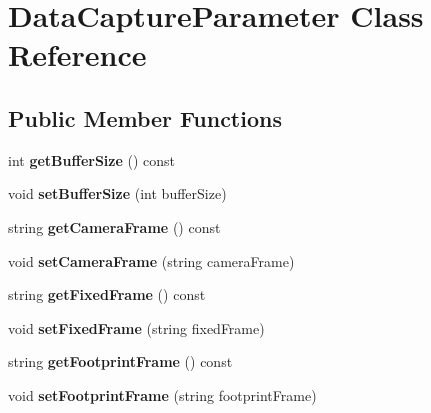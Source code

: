 \hypertarget{classDataCaptureParameter}{\section{\-Data\-Capture\-Parameter \-Class \-Reference}
\label{classDataCaptureParameter}
}
\subsection*{\-Public \-Member \-Functions}
\begin{DoxyCompactItemize}
\item 
\hypertarget{classDataCaptureParameter_a4093e9c66b27849b450bf1bcab7ac35c}{int {\bfseries get\-Buffer\-Size} () const }\label{classDataCaptureParameter_a4093e9c66b27849b450bf1bcab7ac35c}

\item 
\hypertarget{classDataCaptureParameter_aacc7e04c950a9faeec620666eeab7ada}{void {\bfseries set\-Buffer\-Size} (int buffer\-Size)}\label{classDataCaptureParameter_aacc7e04c950a9faeec620666eeab7ada}

\item 
\hypertarget{classDataCaptureParameter_ae1a89313d8378d198adef62ea7b64ab9}{string {\bfseries get\-Camera\-Frame} () const }\label{classDataCaptureParameter_ae1a89313d8378d198adef62ea7b64ab9}

\item 
\hypertarget{classDataCaptureParameter_a7c99eb34bd0ee36ab27591ca465e9981}{void {\bfseries set\-Camera\-Frame} (string camera\-Frame)}\label{classDataCaptureParameter_a7c99eb34bd0ee36ab27591ca465e9981}

\item 
\hypertarget{classDataCaptureParameter_ab68428f31daf6f9e4a537cc3144cdc61}{string {\bfseries get\-Fixed\-Frame} () const }\label{classDataCaptureParameter_ab68428f31daf6f9e4a537cc3144cdc61}

\item 
\hypertarget{classDataCaptureParameter_a7132c6affa2fe957772d9723080e8349}{void {\bfseries set\-Fixed\-Frame} (string fixed\-Frame)}\label{classDataCaptureParameter_a7132c6affa2fe957772d9723080e8349}

\item 
\hypertarget{classDataCaptureParameter_a9ea7189cf620f5ce6ce986151ae59678}{string {\bfseries get\-Footprint\-Frame} () const }\label{classDataCaptureParameter_a9ea7189cf620f5ce6ce986151ae59678}

\item 
\hypertarget{classDataCaptureParameter_a4435144260e57fdba3bc43ff34d5fd4e}{void {\bfseries set\-Footprint\-Frame} (string footprint\-Frame)}\label{classDataCaptureParameter_a4435144260e57fdba3bc43ff34d5fd4e}


\end{DoxyCompactItemize}
